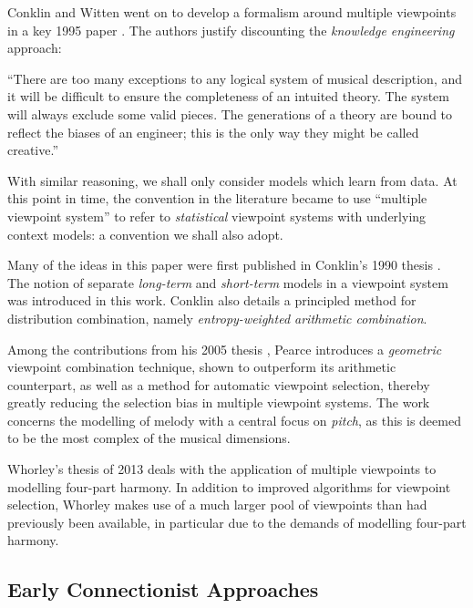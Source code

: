 \documentclass[12pt,a4paper,twoside,openright]{report}
\begin{document}
Conklin and Witten went on to develop a formalism around multiple viewpoints in
a key 1995 paper \cite{conklin1995viewpoints}. The authors justify discounting
the
\emph{knowledge engineering} approach:

\begin{displayquote}
``There are too many exceptions to any
logical system of musical description, and it will be difficult to ensure the
completeness of an intuited theory. The system will always exclude some valid
pieces. The generations of a theory are bound to reflect the biases of an
engineer; this is the only way they might be called creative.''
\end{displayquote}

With similar reasoning, we shall only consider models which learn from data.  At
this point in time, the convention in the literature became to use ``multiple
viewpoint system'' to refer to \emph{statistical} viewpoint systems with
underlying context models: a convention we shall also adopt.

Many of the ideas in this paper were first published in Conklin's 1990 thesis
\cite{conklin1990prediction}. The notion of separate \emph{long-term} and
\emph{short-term} models in a viewpoint system was introduced in this work.
Conklin also details a principled method for distribution combination, namely
\emph{entropy-weighted arithmetic combination}. 

Among the contributions from his 2005 thesis \cite{pearce2005construction},
Pearce introduces a \emph{geometric} viewpoint combination technique, shown to
outperform its arithmetic counterpart, as well as a method for automatic
viewpoint selection, thereby greatly reducing the selection bias in multiple
viewpoint systems. The work concerns the modelling of melody with a central
focus on \emph{pitch}, as this is deemed to be the most complex of the musical
dimensions.

Whorley's thesis of 2013 \cite{whorley2013phd} deals with the application of
multiple viewpoints to modelling four-part harmony. In addition to improved
algorithms for viewpoint selection, Whorley makes use of a much larger pool of
viewpoints than had previously been available, in particular due to the demands
of modelling four-part harmony.

\subsection{Early Connectionist Approaches}
\end{document}
